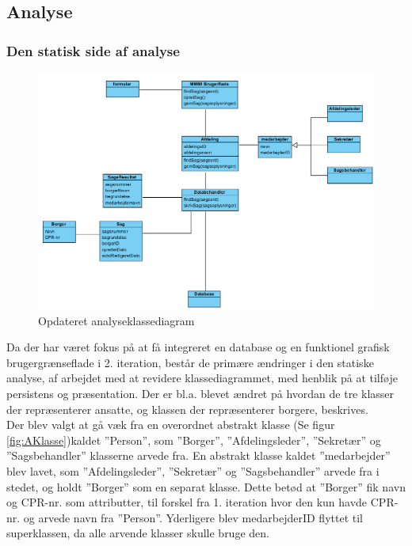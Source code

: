 \subsection{Analyse}
\subsubsection{Den statisk side af analyse}
\begin{figure}[htb!]
  \includegraphics[scale = 0.7]{./PNG/analyse/analyseklassediagramOpdateret.PNG} 
  \caption{Opdateret analyseklassediagram}
  \label{fig:2analyseklasse}
\end{figure}
Da der har været fokus på at få integreret en database og en funktionel grafisk brugergrænseflade i 2. iteration, består de primære ændringer i den statiske analyse, af arbejdet med at revidere klassediagrammet, med henblik på at tilføje persistens og præsentation. Der er bl.a. blevet ændret på hvordan de tre klasser der repræsenterer ansatte, og klassen der repræsenterer borgere, beskrives. \\
Der blev valgt at gå væk fra en overordnet abstrakt klasse (Se figur \ref{fig:AKlasse})kaldet ”Person”, som ”Borger”, ”Afdelingsleder”, ”Sekretær” og ”Sagsbehandler” klasserne arvede fra. En abstrakt klasse kaldet ”medarbejder” blev lavet, som ”Afdelingsleder”, ”Sekretær” og ”Sagsbehandler” arvede fra i stedet, og holdt ”Borger” som en separat klasse. Dette betød at ”Borger” fik navn og CPR-nr. som attributter, til forskel fra 1. iteration hvor den kun havde CPR-nr. og arvede navn fra ”Person”. Yderligere blev medarbejderID flyttet til superklassen, da alle arvende klasser skulle bruge den. \\
